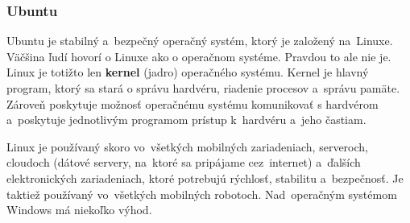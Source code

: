 \subsubsection{Ubuntu}
\label{sec:ubuntu}

Ubuntu je stabilný a~bezpečný operačný systém, ktorý je založený na~Linuxe. Väčšina ľudí hovorí o Linuxe ako o operačnom systéme. Pravdou
to ale nie je. Linux je totižto len \textbf{kernel} (jadro) operačného systému. Kernel je hlavný program, ktorý sa stará o správu hardvéru,
riadenie procesov a~správu pamäte. Zároveň poskytuje možnosť operačnému systému komunikovať s hardvérom a~poskytuje jednotlivým programom
prístup k~hardvéru a~jeho častiam.

Linux je používaný skoro vo~všetkých mobilných zariadeniach, serveroch, cloudoch (dátové servery, na~ktoré sa pripájame cez~internet)
a~ďalších elektronických zariadeniach, ktoré potrebujú rýchlosť, stabilitu a~bezpečnosť. Je taktiež používaný vo~všetkých mobilných
robotoch. Nad~operačným systémom Windows má niekoľko výhod.

